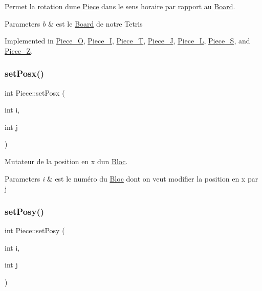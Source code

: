 Permet la rotation d\textquotesingle{}une \hyperlink{classPiece}{Piece} dans le sens horaire par rapport au \hyperlink{classBoard}{Board}. 


\begin{DoxyParams}{Parameters}
{\em b} & est le \hyperlink{classBoard}{Board} de notre Tetris \\
\hline
\end{DoxyParams}


Implemented in \hyperlink{classPiece__O_a69812f938582f176cd4cca997cbb87c1}{Piece\+\_\+O}, \hyperlink{classPiece__I_ab7983a575f6d5d41cbf846b6240a9b43}{Piece\+\_\+I}, \hyperlink{classPiece__T_affedcbe550aebd2a9e8ec169d1fe0a9f}{Piece\+\_\+T}, \hyperlink{classPiece__J_a05b85a353b6d5cefb0055206d4a39014}{Piece\+\_\+J}, \hyperlink{classPiece__L_aa865e9d2c6c468ac2921d6adb88f4d1b}{Piece\+\_\+L}, \hyperlink{classPiece__S_aefb2837f39f6b05bc678a3fdadc192b0}{Piece\+\_\+S}, and \hyperlink{classPiece__Z_a50d6c34030c7641b4827353b9b82a68e}{Piece\+\_\+Z}.

\mbox{\label{classPiece_a2c6f76d78f5c448ba42b11f0b2af12f8}} 
\subsubsection{\texorpdfstring{set\+Posx()}{setPosx()}}
{\footnotesize\ttfamily int Piece\+::set\+Posx (\begin{DoxyParamCaption}\item[{int}]{i,  }\item[{int}]{j }\end{DoxyParamCaption})}



Mutateur de la position en x d\textquotesingle{}un \hyperlink{classBloc}{Bloc}. 


\begin{DoxyParams}{Parameters}
{\em i} & est le numéro du \hyperlink{classBloc}{Bloc} dont on veut modifier la position en x par j \\
\hline
\end{DoxyParams}
\mbox{\label{classPiece_a53af32e68bb73e5ed23f3ac96a9d1516}} 
\subsubsection{\texorpdfstring{set\+Posy()}{setPosy()}}
{\footnotesize\ttfamily int Piece\+::set\+Posy (\begin{DoxyParamCaption}\item[{int}]{i,  }\item[{int}]{j }\end{DoxyParamCaption})}



